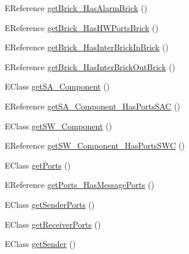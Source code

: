 \begin{DoxyCompactItemize}
\item 
E\-Reference \hyperlink{interfaceshootingmachineemfmodel_1_1_shootingmachineemfmodel_package_a4deec1395013533807a17bda5d3a9b3e}{get\-Brick\-\_\-\-Has\-Alarm\-Brick} ()
\item 
E\-Reference \hyperlink{interfaceshootingmachineemfmodel_1_1_shootingmachineemfmodel_package_add497ce1586024db504c3cc1367ecb9e}{get\-Brick\-\_\-\-Has\-H\-W\-Ports\-Brick} ()
\item 
E\-Reference \hyperlink{interfaceshootingmachineemfmodel_1_1_shootingmachineemfmodel_package_a6b8fd5906acf85729e62e0222ba10f29}{get\-Brick\-\_\-\-Has\-Inter\-Brick\-In\-Brick} ()
\item 
E\-Reference \hyperlink{interfaceshootingmachineemfmodel_1_1_shootingmachineemfmodel_package_a9b8ca62f3002585587b18445d1be0738}{get\-Brick\-\_\-\-Has\-Inter\-Brick\-Out\-Brick} ()
\item 
E\-Class \hyperlink{interfaceshootingmachineemfmodel_1_1_shootingmachineemfmodel_package_ac49fa1dede8bb81104b9803e26716f31}{get\-S\-A\-\_\-\-Component} ()
\item 
E\-Reference \hyperlink{interfaceshootingmachineemfmodel_1_1_shootingmachineemfmodel_package_aeec6cb579a571013f72f8caeecc1d8aa}{get\-S\-A\-\_\-\-Component\-\_\-\-Has\-Ports\-S\-A\-C} ()
\item 
E\-Class \hyperlink{interfaceshootingmachineemfmodel_1_1_shootingmachineemfmodel_package_a888d6241e762ea9199688bbb5c06c947}{get\-S\-W\-\_\-\-Component} ()
\item 
E\-Reference \hyperlink{interfaceshootingmachineemfmodel_1_1_shootingmachineemfmodel_package_aec230ddc6e7f5c944ae6e9dc80dd168f}{get\-S\-W\-\_\-\-Component\-\_\-\-Has\-Ports\-S\-W\-C} ()
\item 
E\-Class \hyperlink{interfaceshootingmachineemfmodel_1_1_shootingmachineemfmodel_package_a3d8e2a50ea904de327878d59e06a49eb}{get\-Ports} ()
\item 
E\-Reference \hyperlink{interfaceshootingmachineemfmodel_1_1_shootingmachineemfmodel_package_a85d9d890687eca85ad161466ba0663af}{get\-Ports\-\_\-\-Has\-Message\-Ports} ()
\item 
E\-Class \hyperlink{interfaceshootingmachineemfmodel_1_1_shootingmachineemfmodel_package_a20b08c481a2cca0182c4bd0f15ab1475}{get\-Sender\-Ports} ()
\item 
E\-Class \hyperlink{interfaceshootingmachineemfmodel_1_1_shootingmachineemfmodel_package_a3814072abeef98ef4b6024cb7797ddec}{get\-Receiver\-Ports} ()
\item 
E\-Class \hyperlink{interfaceshootingmachineemfmodel_1_1_shootingmachineemfmodel_package_a2a69949be5640c789c4f18ac4113f876}{get\-Sender} ()

\end{DoxyCompactItemize}

